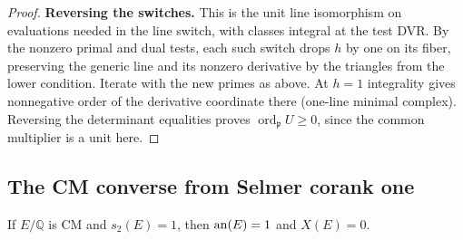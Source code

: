 \begin{proof}
\par\smallskip\noindent\textbf{Reversing the switches.}\enspace
This is the unit line isomorphism on evaluations needed in the line switch, with classes
integral at the test DVR. By the nonzero primal and dual tests, each such switch drops \(h\)
by one on its fiber, preserving the generic line and its nonzero derivative by the triangles
from the lower condition. Iterate with the new primes as above. At \(h=1\) integrality gives
nonnegative order of the derivative coordinate there (one-line minimal complex). Reversing the
determinant equalities proves \(\operatorname{ord}_{\mathfrak p} U\ge0\), since the common
multiplier is a unit here.

\end{proof}

\subsection{The CM converse from Selmer corank one}

\begin{proposition}\label{cm:corank-one}
If \(E/\mathbb Q\) is CM and \(s_2(E)=1\), then
\(\operatorname{an}(E)=1\) and \(X(E)=0\).
\end{proposition}

